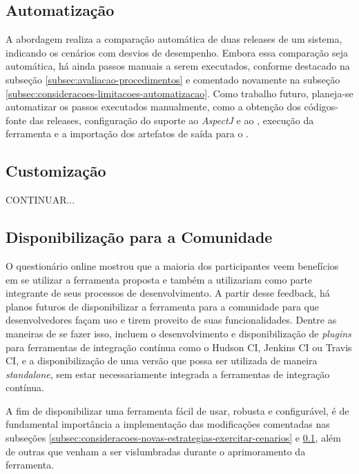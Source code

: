 \subsection{Automatização} \label{subsec:consideracoes-automatizacao}

A abordagem realiza a comparação automática de duas releases de um sistema, indicando os cenários com desvios de desempenho. Embora essa comparação seja automática, há ainda passos manuais a serem executados, conforme destacado na subseção \ref{subsec:avaliacao-procedimentos} e comentado novamente na subseção \ref{subsec:consideracoes-limitacoes-automatizacao}. Como trabalho futuro, planeja-se automatizar os passos executados manualmente, como a obtenção dos códigos-fonte das releases, configuração do suporte ao \textit{AspectJ} e ao \textit{\perfMinerName}, execução da ferramenta e a importação dos artefatos de saída para o \textit{\toolName}.

\subsection{Customização} \label{subsec:consideracoes-customizacao}

{\color{red}CONTINUAR...}

\subsection{Disponibilização para a Comunidade}

O questionário online mostrou que a maioria dos participantes veem benefícios em se utilizar a ferramenta proposta e também a utilizariam como parte integrante de seus processos de desenvolvimento. A partir desse feedback, há planos futuros de disponibilizar a ferramenta para a comunidade para que desenvolvedores façam uso e tirem proveito de suas funcionalidades. Dentre as maneiras de se fazer isso, incluem o desenvolvimento e disponibilização de \textit{plugins} para ferramentas de integração contínua como o Hudson CI, Jenkins CI ou Travis CI, e a disponibilização de uma versão que possa ser utilizada de maneira \textit{standalone}, sem estar necessariamente integrada a ferramentas de integração contínua.

A fim de disponibilizar uma ferramenta fácil de usar, robusta e configurável, é de fundamental importância a implementação das modificações comentadas nas subseções \ref{subsec:consideracoes-novas-estrategias-exercitar-cenarios} e \ref{subsec:consideracoes-automatizacao}, além de outras que venham a ser vislumbradas durante o aprimoramento da ferramenta.